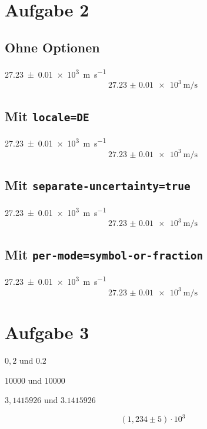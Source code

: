 \documentclass[parskip=half,titlepage=firstiscover]{scrartcl}
\begin{document}
\section*{Aufgabe 2}
\subsection*{Ohne Optionen}
\SI{27.23(1)e3}{\meter\per\second}
\begin{equation}
  \SI{27.23(1)e3}{\meter\per\second} 
\end{equation}

\subsection*{Mit \texttt{locale=DE}}
%
\SI{27.23(1)e3}{\meter\per\second}
\begin{equation}
  \SI{27.23(1)e3}{\meter\per\second} 
\end{equation}

\subsection*{Mit \texttt{separate-uncertainty=true}}
%
\SI{27.23(1)e3}{\meter\per\second}
\begin{equation}
  \SI{27.23(1)e3}{\meter\per\second} 
\end{equation}

\subsection*{Mit \texttt{per-mode=symbol-or-fraction}}
%
\SI{27.23(1)e3}{\meter\per\second}
\begin{equation} 
  \SI{27.23(1)e3}{\meter\per\second} 
\end{equation}

\section*{Aufgabe 3}
$0,2$ und $\num{0,2}$

$10000$ und $\num{10000}$

$3,1415926$ und $\num{3,1415926}$

\begin{equation}
  (1,\!234 \pm 5)\cdot 10^3
\end{equation}
\end{document}
